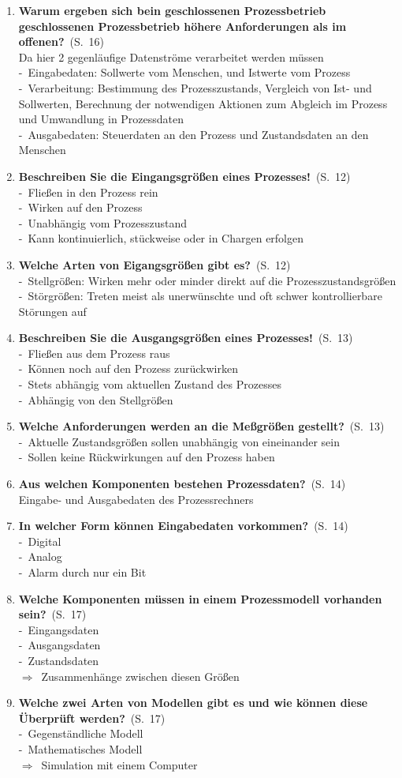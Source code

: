 \documentclass[a4paper,12pt]{article}
\newcommand{\question}[3]{\pagebreak[3]\item {\textbf{#1?}}\ (S.\ #2)#3}
\newcommand{\statement}[3]{\pagebreak[3]\item {\textbf{#1!}}\ (S.\ #2)#3}
\newcommand{\catchword}[1]{\\-\ #1}
\newcommand{\normaltext}[1]{\\#1}
\newcommand{\result}[1]{\\ $\Rightarrow$\ #1}
\newcommand{\page}[1]{#1}
\begin{document}
\begin{enumerate}
  \question{Warum ergeben sich bein geschlossenen Prozessbetrieb geschlossenen Prozessbetrieb höhere Anforderungen
   als im offenen}{\page{16}}
  {
    \normaltext{Da hier 2 gegenläufige Datenströme verarbeitet werden müssen}
    \catchword{Eingabedaten: Sollwerte vom Menschen, und Istwerte vom Prozess}
    \catchword{Verarbeitung: Bestimmung des Prozesszustands, Vergleich von Ist- und Sollwerten, Berechnung der 
    notwendigen Aktionen zum Abgleich im Prozess und Umwandlung in Prozessdaten}
    \catchword{Ausgabedaten: Steuerdaten an den Prozess und Zustandsdaten an den Menschen}
  }

  \statement{Beschreiben Sie die Eingangsgrößen eines Prozesses}{\page{12}}
  {
    \catchword{Fließen in den Prozess rein}
    \catchword{Wirken auf den Prozess}
    \catchword{Unabhängig vom Prozesszustand}
    \catchword{Kann kontinuierlich, stückweise oder in Chargen erfolgen}
  }

  \question{Welche Arten von Eigangsgrößen gibt es}{\page{12}}
  {
    \catchword{Stellgrößen: Wirken mehr oder minder direkt auf die Prozesszustandsgrößen}
    \catchword{Störgrößen: Treten meist als unerwünschte und oft schwer kontrollierbare Störungen auf}
  }

  \statement{Beschreiben Sie die Ausgangsgrößen eines Prozesses}{\page{13}}
  {
    \catchword{Fließen aus dem Prozess raus}
    \catchword{Können noch auf den Prozess zurückwirken}
    \catchword{Stets abhängig vom aktuellen Zustand des Prozesses}
    \catchword{Abhängig von den Stellgrößen}
  }

  \question{Welche Anforderungen werden an die Meßgrößen gestellt}{\page{13}}
  {
    \catchword{Aktuelle Zustandsgrößen sollen unabhängig von eineinander sein}
    \catchword{Sollen keine Rückwirkungen auf den Prozess haben}
  }

  \question{Aus welchen Komponenten bestehen Prozessdaten}{\page{14}}
  {
    \normaltext{Eingabe- und Ausgabedaten des Prozessrechners}
  }

  \question{In welcher Form können Eingabedaten vorkommen}{\page{14}}
  {
    \catchword{Digital}
    \catchword{Analog}
    \catchword{Alarm durch nur ein Bit}
  }

  \question{Welche Komponenten müssen in einem Prozessmodell vorhanden sein}{\page{17}}
  {
    \catchword{Eingangsdaten}
    \catchword{Ausgangsdaten}
    \catchword{Zustandsdaten}
    \result{Zusammenhänge zwischen diesen Größen}
  }

  \question{Welche zwei Arten von Modellen gibt es und wie können diese Überprüft werden}{\page{17}}
  {
    \catchword{Gegenständliche Modell}
    \catchword{Mathematisches Modell}
    \result{Simulation mit einem Computer}
  }


\end{enumerate}
\end{document}
